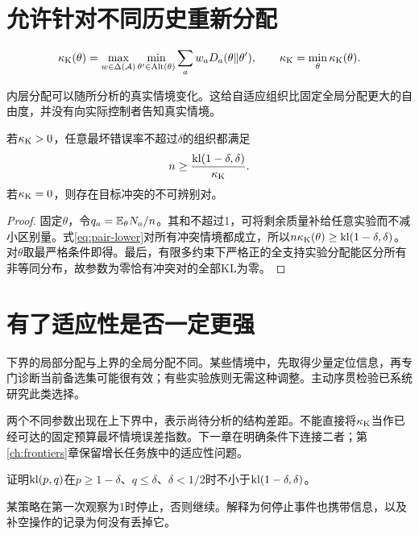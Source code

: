\section{允许针对不同历史重新分配}
\begin{definition}[局部KL参数]
\[
 \kappa_{\mathrm K}(\theta)=
 \max_{w\in\Delta(\mathcal A)}\min_{\theta'\in\operatorname{Alt}(\theta)}
       \sum_aw_aD_a(\theta\Vert\theta'),\qquad
 \kappa_{\mathrm K}=\min_\theta\kappa_{\mathrm K}(\theta).
\]
\end{definition}
内层分配可以随所分析的真实情境变化。这给自适应组织比固定全局分配更大的自由度，并没有向实际控制者告知真实情境。

\begin{theorem}[全类别调用下界]
\label{thm:adaptive-lower}
若$\kappa_{\mathrm K}>0$，任意最坏错误率不超过$\delta$的组织都满足
\[
 n\ge\frac{\operatorname{kl}(1-\delta,\delta)}{\kappa_{\mathrm K}}.
\]
若$\kappa_{\mathrm K}=0$，则存在目标冲突的不可辨别对。
\end{theorem}
\begin{proof}
固定$\theta$，令$q_a=\mathbb E_\theta N_a/n$。其和不超过1，可将剩余质量补给任意实验而不减小区别量。式\eqref{eq:pair-lower}对所有冲突情境都成立，所以$n\kappa_{\mathrm K}(\theta)\ge\operatorname{kl}(1-\delta,\delta)$。对$\theta$取最严格条件即得。最后，有限多约束下严格正的全支持实验分配能区分所有非等同分布，故参数为零恰有冲突对的全部KL为零。
\end{proof}

\section{有了适应性是否一定更强}
下界的局部分配与上界的全局分配不同。某些情境中，先取得少量定位信息，再专门诊断当前备选集可能很有效；有些实验族则无需这种调整。主动序贯检验已系统研究此类选择\citep{naghshvar2013}。

两个不同参数出现在上下界中，表示尚待分析的结构差距。不能直接将$\kappa_{\mathrm K}$当作已经可达的固定预算最坏情境误差指数。下一章在明确条件下连接二者；第\ref{ch:frontiers}章保留增长任务族中的适应性问题。

\begin{exercise}证明$\operatorname{kl}(p,q)$在$p\ge1-\delta$、$q\le\delta$、$\delta<1/2$时不小于$\operatorname{kl}(1-\delta,\delta)$。\end{exercise}
\begin{exercise}某策略在第一次观察为1时停止，否则继续。解释为何停止事件也携带信息，以及补空操作的记录为何没有丢掉它。\end{exercise}
